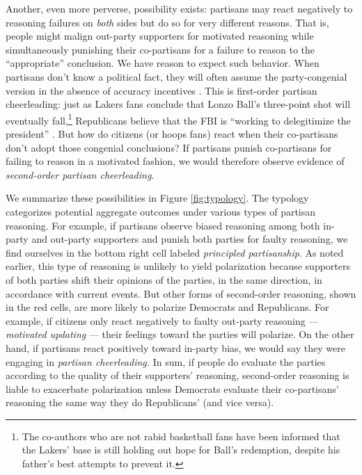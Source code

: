 \documentclass[12pt, letterpaper]{article}
\begin{document}
Another, even more perverse, possibility exists: partisans may react negatively to reasoning failures on \emph{both} sides but do so for very different reasons. That is, people might malign out-party supporters for motivated reasoning while simultaneously punishing their co-partisans for a failure to reason to the ``appropriate'' conclusion. We have reason to expect such behavior. When partisans don't know a political fact, they will often assume the party-congenial version in the absence of accuracy incentives \citep{bullocketal_2015}. This is first-order partisan cheerleading: just as Lakers fans conclude that Lonzo Ball's three-point shot will eventually fall,\footnote{The co-authors who are not rabid basketball fans have been informed that the Lakers' base is still holding out hope for Ball's redemption, despite his father's best attempts to prevent it.} Republicans believe that the FBI is ``working to delegitimize the president'' \citep{kahn2018most}. But how do citizens (or hoops fans) react when their co-partisans don't adopt those congenial conclusions? If partisans punish co-partisans for failing to reason in a motivated fashion, we would therefore observe evidence of \emph{second-order partisan cheerleading}.

We summarize these possibilities in Figure \ref{fig:typology}. The typology categorizes potential aggregate outcomes under various types of partisan reasoning. For example, if partisans observe biased reasoning among both in-party and out-party supporters and punish both parties for faulty reasoning, we find ourselves in the bottom right cell labeled \textit{principled partisanship}. As noted earlier, this type of reasoning is unlikely to yield polarization because supporters of both parties shift their opinions of the parties, in the same direction, in accordance with current events. But other forms of second-order reasoning, shown in the red cells, are more likely to polarize Democrats and Republicans. For example, if citizens only react negatively to faulty out-party reasoning --- \textit{motivated updating} --- their feelings toward the parties will polarize. On the other hand, if partisans react positively toward in-party bias, we would say they were engaging in \textit{partisan cheerleading.} In sum, if people do evaluate the parties according to the quality of their supporters' reasoning, second-order reasoning is liable to exacerbate polarization unless Democrats evaluate their co-partisans' reasoning the same way they do Republicans' (and vice versa).
\end{document}
